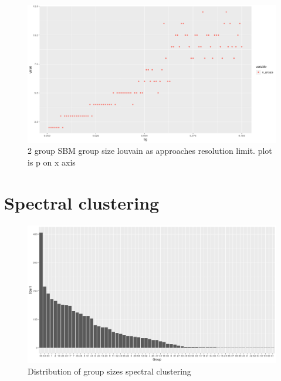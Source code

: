 \begin{figure}
    \centering
    \includegraphics[width=\textwidth]{images/Rplot_group_size_rough_louvain_sbm.png}
    \caption{2 group SBM group size louvain as approaches resolution limit. plot is p on x axis}
    \label{fig:my_rough_louvain group size}
\end{figure}






\section{Spectral clustering}

\begin{figure}
    \centering
    \includegraphics[width=\textwidth]{images/Rplot_group_size_spectral.png}
    \caption{Distribution of group sizes spectral clustering}
    \label{fig:group sizes spectral clustering shows power law distribution}
\end{figure}

